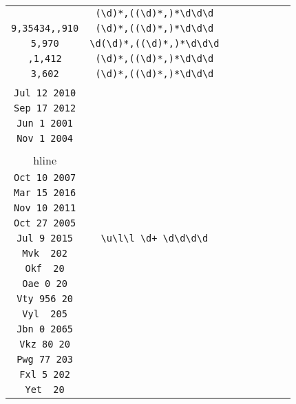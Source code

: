 \begin{longtable}{cccccccc}
\begin{tabular}{ll}
    \verb|,,035| & \verb|(\d)*,((\d)*,)*\d\d\d|\\
\verb|9,35434,,910| & \verb|(\d)*,((\d)*,)*\d\d\d|\\
\verb|5,970| & \verb|\d(\d)*,((\d)*,)*\d\d\d|\\
\verb|,1,412| & \verb|(\d)*,((\d)*,)*\d\d\d|\\
\verb|3,602| & \verb|(\d)*,((\d)*,)*\d\d\d|
\end{tabular}
\\\midrule 
\begin{tabular}{l}
    \verb|Oct 23 2013|\\
\verb|Jul 12 2010|\\
\verb|Sep 17 2012|\\
\verb|Jun 1 2001|\\
\verb|Nov 1 2004|\\
\\hline\\
\verb|Oct 10 2007|\\
\verb|Mar 15 2016|\\
\verb|Nov 10 2011|\\
\verb|Oct 27 2005|\\
\verb|Jul 9 2015|
\end{tabular}

&
\verb|\u\l\l \d+ \d\d\d\d|
&

\begin{tabular}{l}
    \verb|\u\l\l (\d)* 20(\d)*|\\
\verb|Mvk  202|\\
\verb|Okf  20|\\
\verb|Oae 0 20|\\
\verb|Vty 956 20|\\
\verb|Vyl  205|
\end{tabular}

&

\begin{tabular}{l}
    \verb|\u\l\l (\d)* 20(\d)*|\\
\verb|Jbn 0 2065|\\
\verb|Vkz 80 20|\\
\verb|Pwg 77 203|\\
\verb|Fxl 5 202|\\
\verb|Yet  20|
\end{tabular}

&


\end{longtable}

